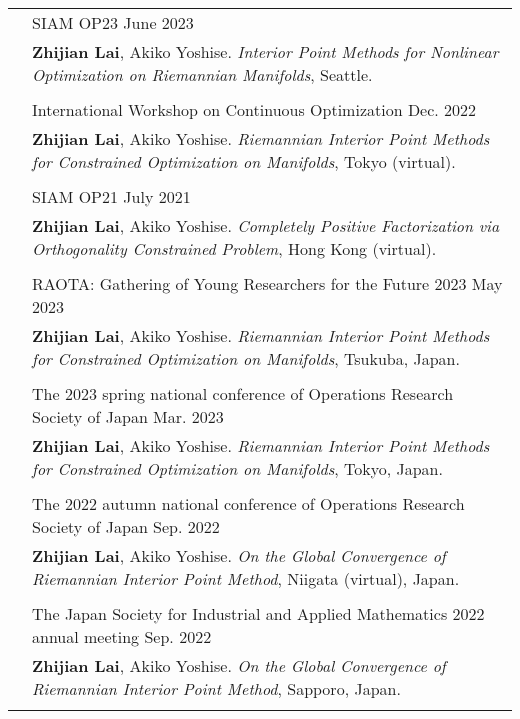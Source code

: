 \documentclass[a4paper,10pt]{article}
\newcommand{\lefttitle}[1]{\color{black}{\textsc{#1}}}
\begin{document}
\begin{longtable}{p{30mm}p{140mm}}
		& {SIAM OP23} \hfill June 2023 \\
		& \textbf{Zhijian Lai}, Akiko Yoshise. \textit{Interior Point Methods for Nonlinear Optimization on Riemannian Manifolds}, Seattle.  \\
		&  \\
		
		& {International Workshop on Continuous Optimization} \hfill Dec. 2022 \\
		& \textbf{Zhijian Lai}, Akiko Yoshise. \textit{Riemannian Interior Point Methods for Constrained Optimization on Manifolds}, Tokyo (virtual).  \\
		&  \\
		
		& {SIAM OP21} \hfill July 2021 \\
		& \textbf{Zhijian Lai}, Akiko Yoshise. \textit{Completely Positive Factorization via Orthogonality Constrained Problem}, Hong Kong (virtual). \\
		& \\
		
		{\lefttitle{Domestic (Japan)}} 
		& {RAOTA: Gathering of Young Researchers for the Future 2023} \hfill May 2023 \\
		{\lefttitle{Conference Talks}} 
		& \textbf{Zhijian Lai}, Akiko Yoshise. \textit{Riemannian Interior Point Methods for Constrained Optimization on Manifolds}, Tsukuba, Japan. \\
		& \\
		
		\newpage
		
		& {The 2023 spring national conference of Operations Research Society of Japan} \hfill Mar. 2023 \\
		& \textbf{Zhijian Lai}, Akiko Yoshise. \textit{Riemannian Interior Point Methods for Constrained Optimization on Manifolds}, Tokyo, Japan. \\
		& \\
		
		& {The 2022 autumn national conference of Operations Research Society of Japan} \hfill Sep. 2022 \\
		& \textbf{Zhijian Lai}, Akiko Yoshise. \textit{On the Global Convergence of Riemannian Interior Point Method}, Niigata (virtual), Japan. \\
		& \\
				
		& {The Japan Society for Industrial and Applied Mathematics 2022 annual meeting} \hfill Sep. 2022 \\
		& \textbf{Zhijian Lai}, Akiko Yoshise. \textit{On the Global Convergence of Riemannian Interior Point Method}, Sapporo, Japan. \\
		& \\	
			

\end{longtable}
\end{document}
